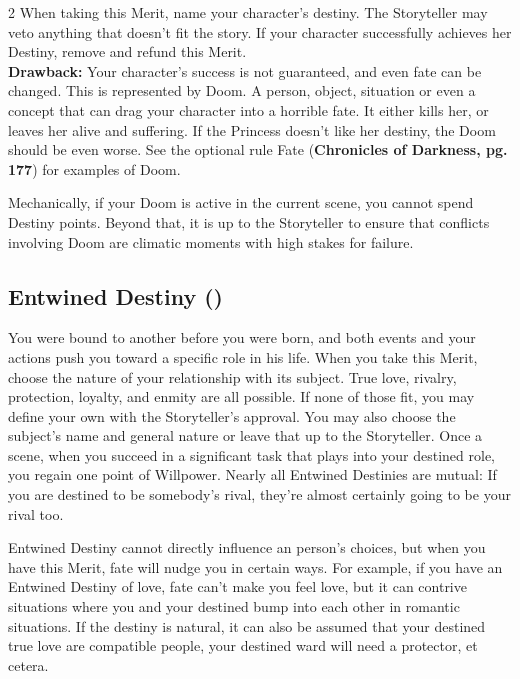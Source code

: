 \begin{multicols}{2}
When taking this Merit, name your character's destiny. The Storyteller may veto anything that doesn't fit the story. If your character successfully achieves her Destiny, remove and refund this Merit.\\

\noindent \textbf{Drawback:} Your character's success is not guaranteed, and even fate can be changed. This is represented by Doom. A person, object, situation or even a concept that can drag your character into a horrible fate. It either kills her, or leaves her alive and suffering. If the Princess doesn't like her destiny, the Doom should be even worse. See the optional rule Fate (\textbf{Chronicles of Darkness, pg. 177}) for examples of Doom. 

Mechanically, if your Doom is active in the current scene, you cannot spend Destiny points. Beyond that, it is up to the Storyteller to ensure that conflicts involving Doom are climatic moments with high stakes for failure.

\subsection*{Entwined Destiny (\textbullet\textbullet\textbullet)}

You were bound to another before you were born, and both events and your actions push you toward a specific role in his life. When you take this Merit, choose the nature of your relationship with its subject. True love, rivalry, protection, loyalty, and enmity are all possible. If none of those fit, you may define your own with the Storyteller's approval. You may also choose the subject's name and general nature or leave that up to the Storyteller. Once a scene, when you succeed in a significant task that plays into your destined role, you regain one point of Willpower. Nearly all Entwined Destinies are mutual: If you are destined to be somebody's rival, they're almost certainly going to be your rival too.  

Entwined Destiny cannot directly influence an person's choices, but when you have this Merit, fate will nudge you in certain ways. For example, if you have an Entwined Destiny of love, fate can't make you feel love, but it can contrive situations where you and your destined bump into each other in romantic situations. If the destiny is natural, it can also be assumed that your destined true love are compatible people, your destined ward will need a protector, et cetera. 


\end{multicols}
